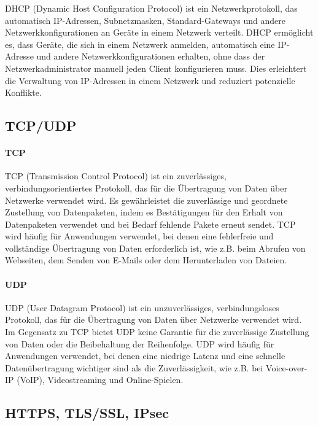 DHCP (Dynamic Host Configuration Protocol) ist ein Netzwerkprotokoll, das automatisch IP-Adressen, Subnetzmasken, Standard-Gateways und andere Netzwerkkonfigurationen an Geräte in einem Netzwerk verteilt. DHCP ermöglicht es, dass Geräte, die sich in einem Netzwerk anmelden, automatisch eine IP-Adresse und andere Netzwerkkonfigurationen erhalten, ohne dass der Netzwerkadministrator manuell jeden Client konfigurieren muss. Dies erleichtert die Verwaltung von IP-Adressen in einem Netzwerk und reduziert potenzielle Konflikte.

\subsection{TCP/UDP}

\paragraph{TCP}

TCP (Transmission Control Protocol) ist ein zuverlässiges, verbindungsorientiertes Protokoll, das für die Übertragung von Daten über Netzwerke verwendet wird. Es gewährleistet die zuverlässige und geordnete Zustellung von Datenpaketen, indem es Bestätigungen für den Erhalt von Datenpaketen verwendet und bei Bedarf fehlende Pakete erneut sendet. TCP wird häufig für Anwendungen verwendet, bei denen eine fehlerfreie und vollständige Übertragung von Daten erforderlich ist, wie z.B. beim Abrufen von Webseiten, dem Senden von E-Mails oder dem Herunterladen von Dateien.

\paragraph{UDP}

UDP (User Datagram Protocol) ist ein unzuverlässiges, verbindungsloses Protokoll, das für die Übertragung von Daten über Netzwerke verwendet wird. Im Gegensatz zu TCP bietet UDP keine Garantie für die zuverlässige Zustellung von Daten oder die Beibehaltung der Reihenfolge. UDP wird häufig für Anwendungen verwendet, bei denen eine niedrige Latenz und eine schnelle Datenübertragung wichtiger sind als die Zuverlässigkeit, wie z.B. bei Voice-over-IP (VoIP), Videostreaming und Online-Spielen.

\subsection{HTTPS, TLS/SSL, IPsec}

